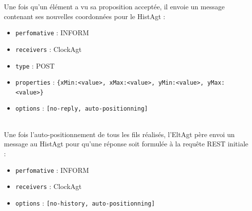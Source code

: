 Une fois qu'un élément a vu sa proposition acceptée, il envoie un message contenant ses nouvelles coordonnées pour le HistAgt :
\begin{itemize}
	\item \lstinline$perfomative$ : INFORM
	\item \lstinline$receivers$ : ClockAgt
	\item \lstinline$type$ : POST
	\item \lstinline$properties$ : \lstinline${xMin:<value>, xMax:<value>, yMin:<value>, yMax:<value>}$
	\item \lstinline$options$ : \lstinline$[no-reply, auto-positionning]$
\end{itemize}
~\\
Une fois l'auto-positionnement de tous les fils réalisés, l'EltAgt père envoi un message au HistAgt pour qu'une réponse soit formulée à la requête REST initiale :
\begin{itemize}
	\item \lstinline$perfomative$ : INFORM
	\item \lstinline$receivers$ : ClockAgt
	\item \lstinline$options$ : \lstinline$[no-history, auto-positionning]$
\end{itemize}

